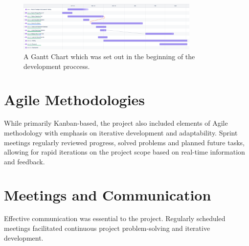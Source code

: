 \begin{figure}[h!]
    \centering
    \includegraphics[width=0.8\textwidth]{images/timeline.png}
    \caption{A Gantt Chart which was set out in the beginning of the development proccess.}
    \label{fig:Gantt Chart}
\end{figure}


\section{Agile Methodologies}
While primarily Kanban-based, the project also included elements of Agile\cite{agilemanifesto2001} methodology with emphasis on iterative development and adaptability. Sprint meetings regularly reviewed progress, solved problems and planned future tasks, allowing for rapid iterations on the project scope based on real-time information and feedback.

\section{Meetings and Communication}

Effective communication was essential to the project. Regularly scheduled meetings facilitated continuous project problem-solving and iterative development.

